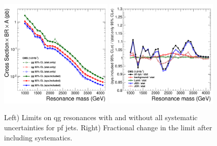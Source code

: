 \begin{figure}[!ht]
  \begin{center}
     \includegraphics[width=0.48\textwidth]{Figures/c_xs_all_pf.pdf}
    \includegraphics[width=0.48\textwidth]{Figures/c_xs_comparison_bw_stat_sys_pf.pdf}
    \caption{Left) Limits on qg resonances with and without all systematic uncertainties for pf jets. 
    Right) Fractional change in the limit after including systematics.}
    \label{limit_change_pf}
  \end{center}
\end{figure}

